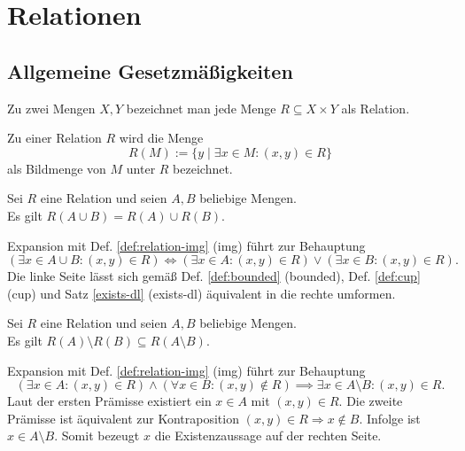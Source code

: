 \newpage
\section{Relationen}

\subsection{Allgemeine Gesetzmäßigkeiten}

\begin{Definition}\newlinefirst
Zu zwei Mengen $X,Y$ bezeichnet man
jede Menge $R\subseteq X\times Y$ als Relation.
\end{Definition}
\begin{Definition}\label{def:relation-img}
Zu einer Relation $R$ wird die Menge
\[R(M) := \{y\mid\exists x\in M\colon (x,y)\in R\}\]
als Bildmenge von $M$ unter $R$ bezeichnet.
\end{Definition}

\begin{Satz}
Sei $R$ eine Relation und seien $A,B$ beliebige Mengen.\\
Es gilt $R(A\cup B) = R(A)\cup R(B)$.
\end{Satz}
\begin{Beweis}
Expansion mit Def. \ref{def:relation-img} (img) führt zur Behauptung
\[(\exists x\in A\cup B\colon (x,y)\in R) \iff (\exists x\in A\colon (x,y)\in R)
\lor (\exists x\in B\colon (x,y)\in R).\]
Die linke Seite lässt sich gemäß Def. \ref{def:bounded} (bounded),
Def. \ref{def:cup} (cup) und Satz \ref{exists-dl} (exists-dl)
äquivalent in die rechte umformen.\;\qedsymbol
\end{Beweis}

\begin{Satz}
Sei $R$ eine Relation und seien $A,B$ beliebige Mengen.\\
Es gilt $R(A)\setminus R(B)\subseteq R(A\setminus B)$.
\end{Satz}
\begin{Beweis}
Expansion mit Def. \ref{def:relation-img} (img) führt zur Behauptung
\[(\exists x\in A\colon (x,y)\in R)\land (\forall x\in B\colon (x,y)\notin R)
\implies \exists x\in A\setminus B\colon (x,y)\in R.\]
Laut der ersten Prämisse existiert ein $x\in A$ mit $(x,y)\in R$. Die
zweite Prämisse ist äquivalent zur Kontraposition $(x,y)\in R\Rightarrow x\notin B$.
Infolge ist $x\in A\setminus B$. Somit bezeugt $x$ die
Existenzaussage auf der rechten Seite.\,\qedsymbol
\end{Beweis}

